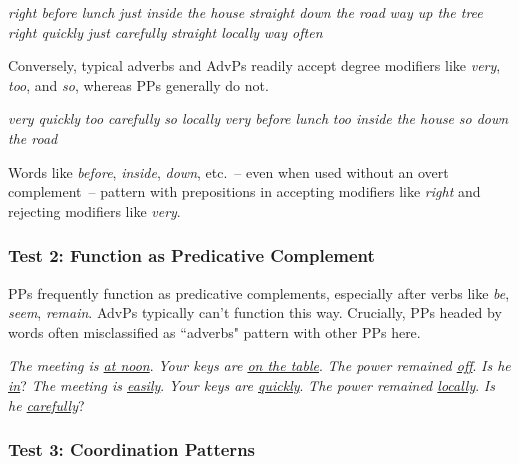 \ea\label{ex:pp-mods} %
   \ea \textit{right before lunch}
   \ex \textit{just inside the house}
   \ex \textit{straight down the road}
   \ex \textit{way up the tree}
   \z
\z
\ea\label{ex:advp-mods} %
   \ea *\textit{right quickly}
   \ex *\textit{just carefully}
   \ex *\textit{straight locally}
   \ex *\textit{way often}
\z
\z

Conversely, typical adverbs and AdvPs readily accept degree modifiers like \textit{very}, \textit{too}, and \textit{so}, whereas PPs generally do not.

\ea\label{ex:advp-mods2} 
   \ea \textit{very quickly}
   \ex \textit{too carefully}
   \ex \textit{so locally}
   \z
\z
\ea\label{ex:pp-mods2} %
   \ea *\textit{very before lunch}
   \ex *\textit{too inside the house}
   \ex *\textit{so down the road}
   \z
\z

Words like \textit{before}, \textit{inside}, \textit{down}, etc.~-- even when used without an overt complement~-- pattern with prepositions in accepting modifiers like \textit{right} and rejecting modifiers like \textit{very}.

\subsubsection*{Test 2: Function as Predicative Complement}\label{sec:test-predcomp}

PPs frequently function as predicative complements, especially after verbs like \textit{be}, \textit{seem}, \textit{remain}. AdvPs typically can't function this way. Crucially, PPs headed by words often misclassified as ``adverbs" pattern with other PPs here.

\ea\label{ex:pp-predcomp} %
   \ea \textit{The meeting is \uline{at noon}}.
   \ex \textit{Your keys are \uline{on the table}}.
   \ex \textit{The power remained \uline{off}}. %
   \ex \textit{Is he \uline{in}}? %
   \z
\z
\ea\label{ex:advp-predcomp} %
   \ea *\textit{The meeting is \uline{easily}}.
   \ex *\textit{Your keys are \uline{quickly}}.
   \ex *\textit{The power remained \uline{locally}}.
   \ex *\textit{Is he \uline{carefully}}?
   \z
\z

\subsubsection*{Test 3: Coordination Patterns}\label{sec:test-coordination}

